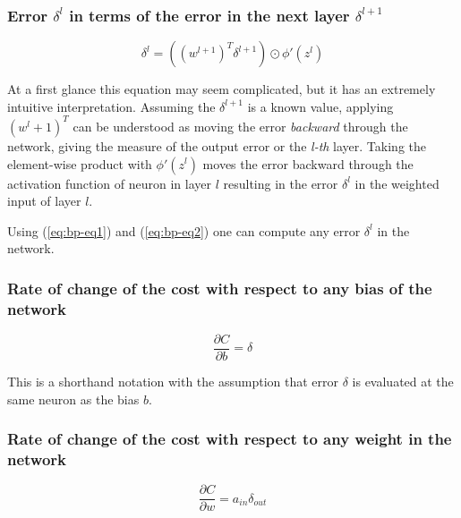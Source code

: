 \subsubsection*{Error $\delta^l$ in terms of the error in the next layer $\delta^{l+1}$}
\label{sub2:delta-l-to-delta-l+1}

\begin{equation}
    \delta^l = \left((w^{l+1})^T\delta^{l+1}\right) \odot \phi'(z^l)
    \tag{EQ2}
    \label{eq:bp-eq2}
\end{equation}

At a first glance this equation may seem complicated, but it has an extremely intuitive interpretation. Assuming the $\delta^{l+1}$ is a known value, applying $(w^l+1)^T$ can be understood as moving the error \emph{backward} through the network, giving the measure of the output error or the \emph{l-th} layer. Taking the element-wise product with $\phi'(z^l)$ moves the error backward through the activation function of neuron in layer $l$ resulting in the error $\delta^l$ in the weighted input of layer $l$.

Using (\ref{eq:bp-eq1}) and (\ref{eq:bp-eq2}) one can compute any error $\delta^l$ in the network.

\subsubsection*{Rate of change of the cost with respect to any bias of the network}
\label{sub2:rate-of-change-of-the-cost-with-respect-to-every-bias-of-the-network}

\begin{equation}
    \frac{\partial C}{\partial b} = \delta
    \tag{EQ3}
    \label{eq:bp-eq3}
\end{equation}

This is a shorthand notation with the assumption that error $\delta$ is evaluated at the same neuron as the bias $b$.

\subsubsection*{Rate of change of the cost with respect to any weight in the network}
\label{sub2:rate-of-change-of-the-cost-with-respect-to-any-weight-in-the-network}

\begin{equation}
    \frac{\partial C}{\partial w} = a_{in} \delta_{out}
    \tag{EQ4}
    \label{eq:bp-eq4}
\end{equation}

